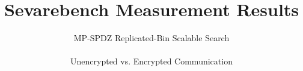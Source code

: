 \title{Sevarebench Measurement Results}
\subtitle{MP-SPDZ Replicated-Bin Scalable Search\\ \hfill \\
Unencrypted vs. Encrypted Communication}


	\frame {
		\titlepage
	}

    
    
    
    
    
    
    

    
    

